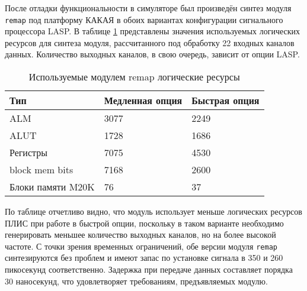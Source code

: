 После отладки функциональности в симуляторе был произведён синтез модуля \texttt{remap} под платформу КАКАЯ в обоих вариантах конфигурации сигнального процессора LASP. В таблице \ref{tab:remap_util} представлены значения используемых логических ресурсов для синтеза модуля, рассчитанного под обработку 22 входных каналов данных. Количество выходных каналов, в свою очередь, зависит от опции LASP.\par
\begin{table}[ht]
    \caption{Используемые модулем remap логические ресурсы}
    \begin{tabular}{|p{}|p{}|p{}|}
        \hline
        Тип & Медленная опция & Быстрая опция \\
        \hline
        ALM & 3077 & 2249 \\
        \hline
        ALUT & 1728 & 1686 \\
        \hline
        Регистры & 7075 & 4530 \\
        \hline
        block mem bits & 7168 & 2600 \\
        \hline
        Блоки памяти M20K & 76 & 37 \\
        \hline
    \end{tabular}
    \label{tab:remap_util}
\end{table}
По таблице отчетливо видно, что модуль использует меньше логических ресурсов ПЛИС при работе в быстрой опции, поскольку в таком варианте необходимо генерировать меньшее количество выходных каналов, но на более высокой частоте. С точки зрения временных ограничений, обе версии модуля \texttt{remap} синтезируются без проблем и имеют запас по установке сигнала в 350 и 260 пикосекунд соответственно. Задержка при передаче данных составляет порядка 30 наносекунд, что удовлетворяет требованиям, предъявляемых модулю.\par

